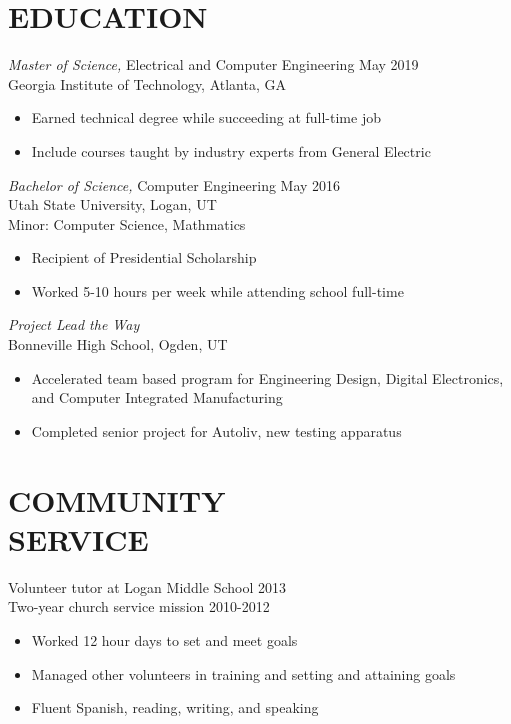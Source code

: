\documentclass[line,margin]{res}
\begin{document}
\begin{resume}
	\section{EDUCATION}
	{\sl Master of Science,} Electrical and Computer Engineering \hfill May 2019\\
   Georgia Institute of Technology, Atlanta, GA
   \begin{itemize} \itemsep -2pt %
	   \item Earned technical degree while succeeding at full-time job
	   \item Include courses taught by industry experts from General Electric
   \end{itemize}


   {\sl Bachelor of Science,} Computer Engineering \hfill May 2016\\
   Utah State University, Logan, UT\\
   Minor: Computer Science, Mathmatics
   \begin{itemize} \itemsep -2pt %
	   \item Recipient of Presidential Scholarship
	   \item Worked 5-10 hours per week while attending school full-time
   \end{itemize}

   {\sl Project Lead the Way}\\
   Bonneville High School, Ogden, UT
   \begin{itemize} \itemsep -2pt
	   \item Accelerated team based program for Engineering Design, Digital Electronics,
			 and Computer Integrated Manufacturing
	   \item Completed senior project for Autoliv, new testing apparatus
   \end{itemize}

	\section{COMMUNITY \\ SERVICE}


	Volunteer tutor at Logan Middle School \hfill 2013
	\\Two-year church service mission \hfill 2010-2012
	\begin{itemize} \itemsep -2pt %
		\item Worked 12 hour days to set and meet goals
		\item Managed other volunteers in training and setting and attaining goals
		\item Fluent Spanish, reading, writing, and speaking
	\end{itemize}


\end{resume}
\end{document}
